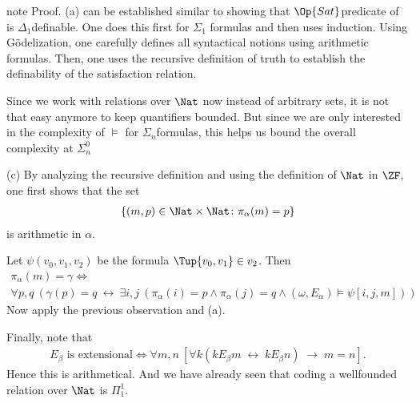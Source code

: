 \documentclass[letterpaper,10pt,english]{jupyterBook}
\begin{document}
\begin{sphinxadmonition}{note}
\sphinxAtStartPar
Proof. (a) can be established similar to showing that \(\Op{Sat}\)\sphinxhyphen{}predicate of {\hyperref[\detokenize{constructible:thm-sat-predicate}]{}} is \(\Delta_1\)\sphinxhyphen{}definable. One does this first for \(\Sigma_1\) formulas and then uses induction. Using Gödelization, one carefully defines all syntactical notions using arithmetic formulas. Then, one uses the recursive definition of truth to establish the definability of the satisfaction relation.

\sphinxAtStartPar
Since we work with relations over \(\Nat\) now instead of arbitrary sets, it is not that easy anymore to keep quantifiers bounded. But since we are only interested in the complexity of \(\models\) for \(\Sigma_n\)\sphinxhyphen{}formulas, this helps us bound the overall complexity at \(\Sigma^0_n\)

\sphinxAtStartPar
(c) By analyzing the recursive definition and using the definition of \(\Nat\) in \(\ZF\), one first shows that the set
\begin{equation*}
\begin{split}
    \{ (m,p) \in \Nat\times \Nat  \colon \pi_\alpha(m) = p \}
\end{split}
\end{equation*}
\sphinxAtStartPar
is arithmetic in \(\alpha\).

\sphinxAtStartPar
Let \(\psi(v_0, v_1, v_2)\) be the formula \(\Tup{v_0, v_1} \in v_2\). Then
\begin{multline*}
    \pi_\alpha(m) = \gamma \iff \\ 
    \forall p, q \: \left (\gamma(p) = q \: \leftrightarrow \: \exists i,j \: (\pi_\alpha(i) = p \wedge \pi_\alpha(j)=q \wedge (\omega,E_\alpha) \models \psi[i,j,m]) \right )
\end{multline*}
\sphinxAtStartPar
Now apply the previous observation and (a).
\end{sphinxadmonition}

\sphinxAtStartPar
Finally, note that
\begin{equation*}
\begin{split}
	\text{$E_\beta$ is extensional} \iff \forall m,n \: [\forall k (k E_\beta m \; \leftrightarrow \; k E_\beta n) \; \to \; m=n ].
\end{split}
\end{equation*}
\sphinxAtStartPar
Hence this is arithmetical. And we have already seen that coding a well\sphinxhyphen{}founded relation over \(\Nat\) is \(\Pi^1_1\).
\end{document}
